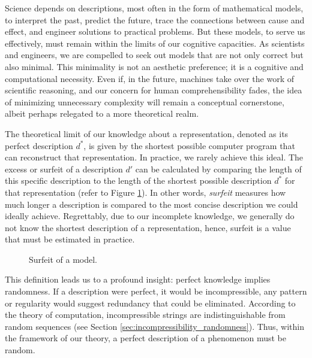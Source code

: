 Science depends on descriptions, most often in the form of mathematical models, to interpret the past, predict the future, trace the connections between cause and effect, and engineer solutions to practical problems. But these models, to serve us effectively, must remain within the limits of our cognitive capacities. As scientists and engineers, we are compelled to seek out models that are not only correct but also minimal. This minimality is not an aesthetic preference; it is a cognitive and computational necessity. Even if, in the future, machines take over the work of scientific reasoning, and our concern for human comprehensibility fades, the idea of minimizing unnecessary complexity will remain a conceptual cornerstone, albeit perhaps relegated to a more theoretical realm.

The theoretical limit of our knowledge about a representation, denoted as its perfect description $d^\ast$, is given by the shortest possible computer program that can reconstruct that representation. In practice, we rarely achieve this ideal. The excess or surfeit of a description $d'$ can be calculated by comparing the length of this specific description to the length of the shortest possible description $d^\ast$ for that representation (refer to Figure \ref{fig:intro-surfeit}). In other words, \emph{surfeit} measures how much longer a description is compared to the most concise description we could ideally achieve. Regrettably, due to our incomplete knowledge, we generally do not know the shortest description of a representation, hence, surfeit is a value that must be estimated in practice.

\begin{figure}[t]
\centering
{}
\caption{\label{fig:intro-surfeit}Surfeit of a model.}
\end{figure}

This definition leads us to a profound insight: perfect knowledge implies randomness. If a description were perfect, it would be incompressible, any pattern or regularity would suggest redundancy that could be eliminated. According to the theory of computation, incompressible strings are indistinguishable from random sequences (see Section \ref{sec:incompressibility_randomness}). Thus, within the framework of our theory, a perfect description of a phenomenon must be random.

